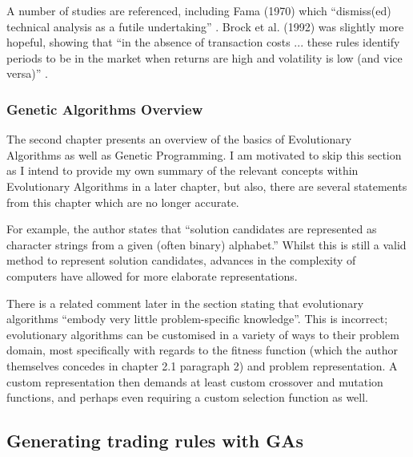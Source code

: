 A number of studies are referenced, including Fama (1970) which ``dismiss(ed) technical analysis as a futile undertaking'' \cite{fama70}. Brock et al. (1992) was slightly more hopeful, showing that ``in the absence of transaction costs ... these rules identify periods to be in the market when returns are high and volatility is low (and vice versa)'' \cite{brock92}.

\subsubsection{Genetic Algorithms Overview}
The second chapter presents an overview of the basics of Evolutionary Algorithms as well as Genetic Programming. I am motivated to skip this section as I intend to provide my own summary of the relevant concepts within Evolutionary Algorithms in a later chapter, but also, there are several statements from this chapter which are no longer accurate. \newline

For example, the author states that ``solution candidates are represented as character strings from a given (often binary) alphabet.'' Whilst this is still a valid method to represent solution candidates, advances in the complexity of computers have allowed for more elaborate representations. \newline

There is a related comment later in the section stating that evolutionary algorithms ``embody very little problem-specific knowledge''. This is incorrect; evolutionary algorithms can be customised in a variety of ways to their problem domain, most specifically with regards to the fitness function (which the author themselves concedes in chapter 2.1 paragraph 2) and problem representation. A custom representation then demands at least custom crossover and mutation functions, and perhaps even requiring a custom selection function as well.

\subsection{Generating trading rules with GAs \cite{potvinaSorianoaVallee}}